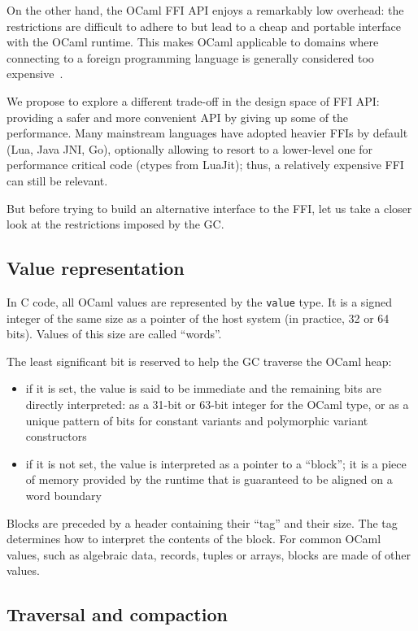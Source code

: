 \documentclass[a4paper]{easychair}
\newcommand{\caml}[1]{\smash{\lstinline{#1}}}
\newcommand{\cpp}[1]{\lstinline[style=C++]{#1}}
\begin{document}
On the other hand, the OCaml FFI API enjoys a remarkably low overhead:
the restrictions are difficult to adhere to but lead to a cheap and portable
interface with the OCaml runtime. This makes OCaml applicable to domains
where connecting to a foreign programming language is generally
considered too expensive~\citep{bourke:hal-01408230}.

We propose to explore a different trade-off in the design space of FFI
API: providing a safer and more convenient API by giving up some of the
performance.  Many mainstream languages have adopted heavier FFIs by default
(Lua, Java JNI, Go), optionally allowing to resort to a lower-level one
for performance critical code (ctypes from LuaJit); thus, a relatively
expensive FFI can still be relevant.

But before trying to build an alternative interface to the FFI, let us take a
closer look at the restrictions imposed by the GC.

\subsection{Value representation}

In C code, all OCaml values are represented by the \cpp{value} type. It is a
signed integer of the same size as a pointer of the host system (in practice,
32 or 64 bits). Values of this size are called ``words''.

The least significant bit is reserved to help the GC traverse the OCaml
heap:
%
\begin{itemize}
\item if it is set, the value is said to be immediate and the remaining bits
      are directly interpreted: as a 31-bit or 63-bit integer for the
      \caml{int} OCaml type, or as a unique pattern of bits for constant
      variants and polymorphic variant constructors
\item if it is not set, the value is interpreted as a pointer to a
      ``block''; it is a piece of memory provided by the runtime that is
      guaranteed to be aligned on a word boundary
\end{itemize}

Blocks are preceded by a header containing their ``tag'' and their
size. The tag determines how to interpret the contents of the block.
For common OCaml values, such as algebraic data, records, tuples or
arrays, blocks are made of other values.

\subsection{Traversal and compaction}
\end{document}

